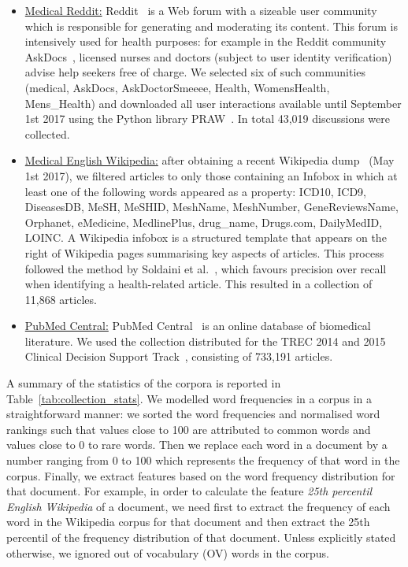 \documentclass[10pt,a4paper]{article}
\begin{document}
\begin{itemize}[leftmargin=*]
	\item \underline{Medical Reddit:} Reddit~\cite{reddit} is a Web forum with a sizeable user community which is responsible for generating and moderating its content. This forum is intensively used for health purposes: for example in the Reddit community AskDocs~\cite{redditaskdocs}, licensed nurses and doctors (subject to user identity verification) advise help seekers free of charge. We selected six of such communities (medical, AskDocs, AskDoctorSmeeee, Health, WomensHealth, Mens\_Health) and downloaded all user interactions available until September 1st 2017 using the Python library PRAW~\cite{redditapi}. In total 43,019 discussions were collected.
	
	\item \underline{Medical English Wikipedia:} after obtaining a recent Wikipedia dump~\cite{wikipedia} (May 1st 2017), we filtered articles to only those containing an Infobox in which at least one of the following words appeared as a property: ICD10, ICD9, DiseasesDB, MeSH, MeSHID, MeshName, MeshNumber, GeneReviewsName, Orphanet, eMedicine, MedlinePlus, drug\_name, Drugs.com, DailyMedID, LOINC. A Wikipedia infobox is a structured template that appears on the right of Wikipedia pages summarising key aspects of articles. 
	This process followed the method by Soldaini et al.~\cite{soldaini15}, which favours precision over recall when identifying a health-related article. This resulted in a collection of 11,868 articles. 
	
	\item \underline{PubMed Central:} PubMed Central~\cite{pubmed} is an online  database of biomedical literature. We used the collection distributed for the TREC 2014 and 2015 Clinical Decision Support Track~\cite{roberts16,trec15}, consisting of 733,191 articles. 
	
\end{itemize}

A summary of the statistics of the corpora is reported in Table~\ref{tab:collection_stats}. 
We modelled word frequencies in a corpus in a straightforward manner: we sorted the word frequencies and normalised word rankings such that values close to 100 are attributed to common words and values close to 0 to rare words. Then we replace each word in a document by a number ranging from 0 to 100 which represents the frequency of that word in the corpus. 
Finally, we extract features based on the word frequency distribution for that document. For example, in order to calculate the feature \textit{25th percentil English Wikipedia} of a document, we need first to extract the frequency of each word in the Wikipedia corpus for that document and then extract the 25th percentil of the frequency distribution of that document. 
Unless explicitly stated otherwise, we ignored out of vocabulary (OV) words in the corpus.
\end{document}
